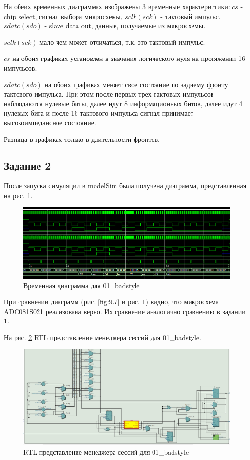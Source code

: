 \documentclass[a4paper,14pt]{article}
\begin{document}
	На обеих временных диаграммах изображены 3 временные характеристики: $cs$ - chip select, сигнал выбора микросхемы, $sclk(sck)$ - тактовый импульс, $sdata(sdo)$ - slave data out, данные, получаемые из микросхемы.
	
	$sclk(sck)$ мало чем может отличаться, т.к. это тактовый импульс.
	
	$cs$ на обоих графиках установлен в значение логического нуля на протяжении 16 импульсов.
	
	$sdata(sdo)$ на обоих графиках меняет свое состояние по заднему фронту тактового импульса. При этом после первых трех тактовых импульсов наблюдаются нулевые биты, далее идут 8 информационных битов, далее идут 4 нулевых бита и после 16 тактового импульса сигнал принимает высокоимпедансное состояние.
	
	Разница в графиках только в длительности фронтов.	
	
	\subsection{Задание 2}

	После запуска симуляции в modelSim была получена диаграмма, представленная на рис. \ref{fig:z15msimwvf}.
	
	\begin{figure}[H]
		\centering
		\includegraphics[width=0.9\linewidth]{images/z1_5_msim_wvf}
		\caption{Временная диаграмма для 01\_badstyle}
		\label{fig:z15msimwvf}
	\end{figure}

	При сравнении диаграмм (рис. \ref{fig:9.7} и рис. \ref{fig:z15msimwvf}) видно, что микросхема ADC081S021 реализована верно. Их сравнение аналогично сравнению в задании 1.
	
	На рис. \ref{fig:z15rtl} RTL представление менеджера сессий для 01\_badstyle.
	
	\begin{figure}[H]
		\centering
		\includegraphics[width=0.9\linewidth]{images/z1_5_rtl}
		\caption{RTL представление менеджера сессий для 01\_badstyle}
		\label{fig:z15rtl}
	\end{figure}
\end{document}
